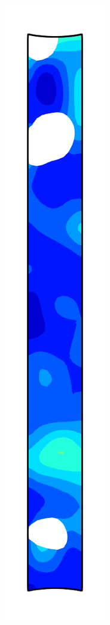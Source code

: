 \begin{figure}[!htb]
\begin{subfigure}{0.08\textwidth}
  \end{subfigure}
  \begin{subfigure}{0.08\textwidth}
    \centering
    \includegraphics[width=\textwidth]{Chapter5/figures/spallation/psie_5}

\end{subfigure}
\end{figure}
